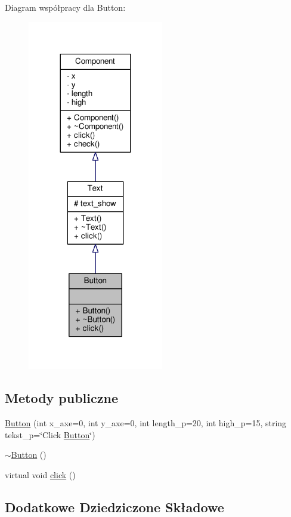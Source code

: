 Diagram współpracy dla Button\+:
\nopagebreak
\begin{figure}[H]
\begin{center}
\leavevmode
\includegraphics[width=168pt]{classButton__coll__graph}
\end{center}
\end{figure}
\subsection*{Metody publiczne}
\begin{DoxyCompactItemize}
\item 
\hyperlink{classButton_affc1899d8e846ffda38377637d675d29}{Button} (int x\+\_\+axe=0, int y\+\_\+axe=0, int length\+\_\+p=20, int high\+\_\+p=15, string tekst\+\_\+p=\char`\"{}Click \hyperlink{classButton}{Button}\char`\"{})
\item 
\hyperlink{classButton_a2a001eb9c3cc8ae54768a850dd345002}{$\sim$\+Button} ()
\item 
virtual void \hyperlink{classButton_a2fc33ec22217562b28ac6f02bda26c6e}{click} ()
\end{DoxyCompactItemize}
\subsection*{Dodatkowe Dziedziczone Składowe}


